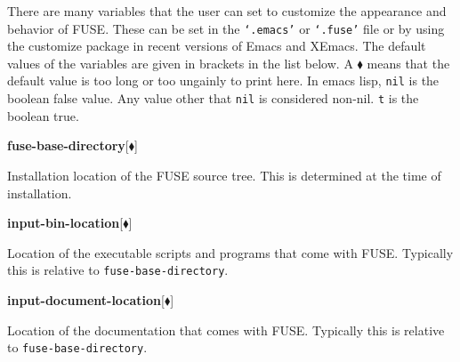 \documentclass[twocolumn]{article}
\def\FUSE{{\textsf{FUSE}}}
\def\file#1{{\texttt{`#1'}}}
\begin{document}
\def\longmark{{$\blacklozenge$}}

There are many variables that the user can set to customize the
appearance and behavior of {\FUSE}.  These can be set in the
\file{.emacs} or \file{.fuse} file or by using the customize package
in recent versions of Emacs and XEmacs.  The default values of the
variables are given in brackets in the list below.  A {\longmark}
means that the default value is too long or too ungainly to print
here.  In emacs lisp, \texttt{nil} is the boolean false value.  Any
value other that \texttt{nil} is considered non-nil.  \texttt{t} is
the boolean true.

\def\variable#1#2#3{{
      \begin{flushright}
    \begin{minipage}[h]{0.97\linewidth}
      \vspace{-0.15truecm}
      \textbf{#1}\hfill[\texttt{#2}]
      \begin{flushright}
        \begin{minipage}[h]{0.93\linewidth}
          \vspace{-0.2truecm}
          #3
        \end{minipage}
      \end{flushright}
    \end{minipage}
      \end{flushright}
    }}

\def\vsep#1{{
    \vspace{0.3truecm}
    \begin{center}\textbf{\large #1}\end{center}
    \vspace{0.15truecm}  }}

\vspace{0.5truecm}


\variable{fuse-base-directory}{\longmark}{Installation location
  of the {\FUSE} source tree.  This is determined at the time of
  installation.}

\variable{input-bin-location}{\longmark}{Location of the
  executable scripts and programs that come with {\FUSE}.  Typically
  this is relative to \texttt{fuse-base-directory}.}

\variable{input-document-location}{\longmark}{Location of the
  documentation that comes with {\FUSE}.  Typically this is relative
  to \texttt{fuse-base-directory}.}
\end{document}
